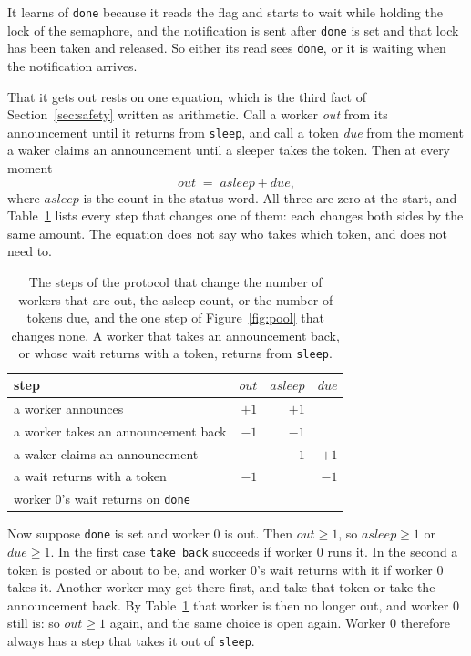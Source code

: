 \documentclass[sigplan,nonacm]{acmart}
\begin{document}
It learns of \lstinline|done| because it reads the flag and starts to
wait while holding the lock of the semaphore, and the notification is
sent after \lstinline|done| is set and that lock has been taken and
released.
%
So either its read sees \lstinline|done|, or it is waiting when the
notification arrives.

That it gets out rests on one equation, which is the third fact of
Section~\ref{sec:safety} written as arithmetic.
%
Call a worker \emph{out} from its announcement until it returns from
\lstinline|sleep|, and call a token \emph{due} from the moment a waker
claims an announcement until a sleeper takes the token.
%
Then at every moment
\[ \mathit{out} \;=\; \mathit{asleep} + \mathit{due}, \]
where $\mathit{asleep}$ is the count in the status word.
%
All three are zero at the start, and Table~\ref{tbl:steps} lists
every step that changes one of them: each changes both sides by the
same amount.
%
The equation does not say who takes which token, and does not need
to.

\begin{table}
\small
\begin{tabular}{@{}lrrr@{}}
\toprule
step & $\mathit{out}$ & $\mathit{asleep}$ & $\mathit{due}$ \\
\midrule
a worker announces & $+1$ & $+1$ & \\
a worker takes an announcement back & $-1$ & $-1$ & \\
a waker claims an announcement & & $-1$ & $+1$ \\
a wait returns with a token & $-1$ & & $-1$ \\
worker 0's wait returns on \lstinline|done| & & & \\
\bottomrule
\end{tabular}
\caption{The steps of the protocol that change the number of workers
  that are out, the asleep count, or the number of tokens due, and the
  one step of Figure~\ref{fig:pool} that changes none. A worker that
  takes an announcement back, or whose wait returns with a token,
  returns from \lstinline|sleep|.}
\label{tbl:steps}
\end{table}

Now suppose \lstinline|done| is set and worker 0 is out.
%
Then $\mathit{out} \geq 1$, so $\mathit{asleep} \geq 1$ or
$\mathit{due} \geq 1$.
%
In the first case \lstinline|take_back| succeeds if worker 0 runs it.
%
In the second a token is posted or about to be, and worker 0's wait
returns with it if worker 0 takes it.
%
Another worker may get there first, and take that token or take the
announcement back.
%
By Table~\ref{tbl:steps} that worker is then no longer out, and
worker 0 still is: so $\mathit{out} \geq 1$ again, and the same
choice is open again.
%
Worker 0 therefore always has a step that takes it out of
\lstinline|sleep|.
\end{document}
